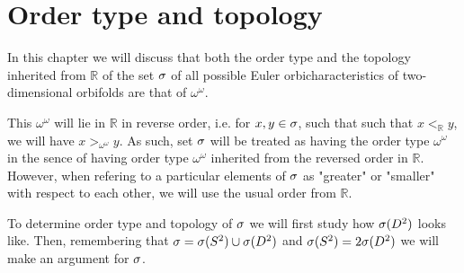 \chapter{Order type and topology}\label{order structure}
%
%
%

In this chapter we will discuss that both the order type and the topology inherited from $\mathbb{R}$
of the set ${\sigma}$ of all possible Euler orbicharacteristics 
of two-dimensional orbifolds are that of $\omega^\omega$. 

This $\omega^\omega$ will lie in $\mathbb{R}$ in reverse order, i.e. for $x, y \in {\sigma}$, 
such that such that $x <_{\mathbb{R}} y$, we will have $x >_{\omega^\omega} y$. 
As such, set ${\sigma}$ will be treated as having the order type $\omega^\omega$ in the sence of 
having order type $\omega^\omega$ inherited from the reversed order in $\mathbb{R}$. 
However, when refering to a particular elements of ${\sigma}$ as "greater" or "smaller" with 
respect to each other, we will use the usual order from $\mathbb{R}$.


To determine order type and topology of ${\sigma}$ we will first study how ${{\sigma}(D^2)}$ looks like. 
Then, remembering that 
${\sigma} = {{\sigma}(S^2)} \cup {{\sigma}(D^2)}$ and ${{\sigma}(S^2)} = 2{{\sigma}(D^2)}$ we will make an argument for ${\sigma}$. 





